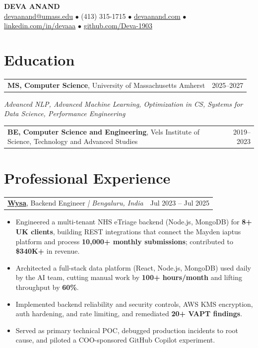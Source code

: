 \documentclass[letterpaper,11pt]{article}
\makeatletter
\newcommand{\eduItem}[3]{%
  \begin{tabular*}{\textwidth}{@{}l@{\extracolsep{\fill}}r@{}}
    \textbf{#1}, #2 & #3 \\
  \end{tabular*}\par
}
\newcommand{\expItem}[4]{%
  \vspace{3pt}
  \begin{tabular*}{\textwidth}{@{}l@{\extracolsep{\fill}}r@{}}
    \textbf{#1}, #2 \textit{| #3} & #4 \\
  \end{tabular*}\par\vspace{-2pt}
}
\makeatother
\begin{document}
\begin{center}
    {\fontsize{18}{20}\selectfont\bfseries DEVA ANAND}\\ \vspace{3pt}
    {\small
    \href{mailto:devaanand@umass.edu}{devaanand@umass.edu}
    \enspace$\bullet$\enspace
    (413) 315-1715
    \enspace$\bullet$\enspace
    \href{https://devaanand.com}{devaanand.com}
    \enspace$\bullet$\enspace
    \href{https://linkedin.com/in/devaaa/}{linkedin.com/in/devaaa}
    \enspace$\bullet$\enspace
    \href{https://github.com/Deva-1903}{github.com/Deva-1903}}
\end{center}
\vspace{-6pt}

\section{Education}
\eduItem{MS, Computer Science}{University of Massachusetts Amherst}{2025--2027}
{\small\textit{Advanced NLP, Advanced Machine Learning, Optimization in CS, Systems for Data Science, Performance Engineering}}\par
\vspace{3pt}
\eduItem{BE, Computer Science and Engineering}{Vels Institute of Science, Technology and Advanced Studies}{2019--2023}

\section{Professional Experience}

\expItem{\href{https://www.wysa.io}{Wysa}}{Backend Engineer}{Bengaluru, India}{Jul 2023 -- Jul 2025}
\begin{itemize}
  \item Engineered a multi-tenant NHS eTriage backend (Node.js, MongoDB) for \textbf{8+ UK clients}, building REST integrations that connect the Mayden iaptus platform and process \textbf{10{,}000+ monthly submissions}; contributed to \textbf{\$340K+} in revenue.
  \item Architected a full-stack data platform (React, Node.js, MongoDB) used daily by the AI team, cutting manual work by \textbf{100+ hours/month} and lifting throughput by \textbf{60\%}.
  \item Implemented backend reliability and security controls, AWS KMS encryption, auth hardening, and rate limiting, and remediated \textbf{20+ VAPT findings}.
  \item Served as primary technical POC, debugged production incidents to root cause, and piloted a COO-sponsored GitHub Copilot experiment.
\end{itemize}
\end{document}
